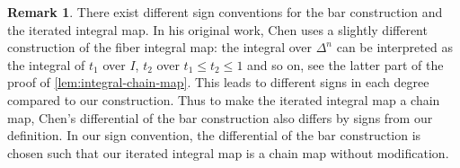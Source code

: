 \documentclass{scrartcl}
\theoremstyle{plain}
\theoremstyle{definition}
\newtheorem{remark}[theorem]{Remark}
\begin{document}
\begin{remark}
    There exist different sign conventions for the bar construction and the iterated integral map. In his original work, Chen uses a slightly different construction of the fiber integral map: the integral over $\Delta^n$ can be interpreted as the integral of $t_1$ over $I$, $t_2$ over $t_1\leq t_2\leq 1$ and so on, see the latter part of the proof of \cref{lem:integral-chain-map}. This leads to different signs in each degree compared to our construction. Thus to make the iterated integral map a chain map, Chen's differential of the bar construction also differs by signs from our definition. In our sign convention, the differential of the bar construction is chosen such that our iterated integral map is a chain map without modification.
\end{remark}
\end{document}
